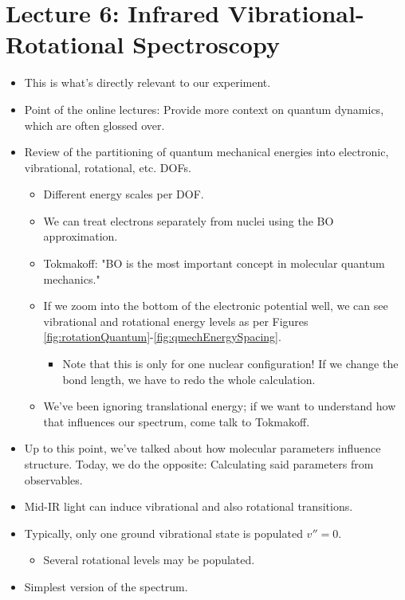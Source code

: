 \documentclass[../notes.tex]{subfiles}
\begin{document}
\section{Lecture 6: Infrared Vibrational-Rotational Spectroscopy}
\begin{itemize}
    \item {}This is what's directly relevant to our  experiment.
    \item Point of the online lectures: Provide more context on quantum dynamics, which are often glossed over.
    \item Review of the partitioning of quantum mechanical energies into electronic, vibrational, rotational, etc. DOFs.
    \begin{itemize}
        \item Different energy scales per DOF.
        \item We can treat electrons separately from nuclei using the BO approximation.
        \item Tokmakoff: "BO is the most important concept in molecular quantum mechanics."
        \item If we zoom into the bottom of the electronic potential well, we can see vibrational and rotational energy levels as per Figures \ref{fig:rotationQuantum}-\ref{fig:qmechEnergySpacing}.
        \begin{itemize}
            \item Note that this is only for one nuclear configuration! If we change the bond length, we have to redo the whole calculation.
        \end{itemize}
        \item We've been ignoring translational energy; if we want to understand how that influences our  spectrum, come talk to Tokmakoff.
    \end{itemize}
    \item Up to this point, we've talked about how molecular parameters influence structure. Today, we do the opposite: Calculating said parameters from observables.
    \item Mid-IR light can induce vibrational and also rotational transitions.
    \item Typically, only one ground vibrational state is populated $v''=0$.
    \begin{itemize}
        \item Several rotational levels may be populated.
    \end{itemize}
    \item Simplest version of the spectrum.

\end{itemize}
\end{document}
